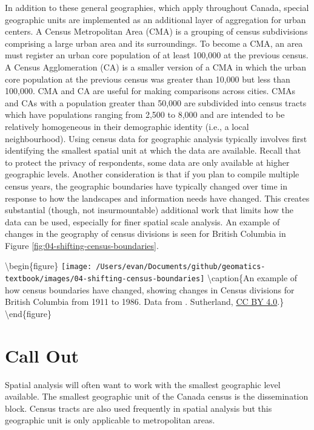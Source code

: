 \documentclass[
]{book}
\begin{document}
In addition to these general geographies, which apply throughout Canada, special geographic units are implemented as an additional layer of aggregation for urban centers. A Census Metropolitan Area (CMA) is a grouping of census subdivisions comprising a large urban area and its surroundings. To become a CMA, an area must register an urban core population of at least 100,000 at the previous census. A Census Agglomeration (CA) is a smaller version of a CMA in which the urban core population at the previous census was greater than 10,000 but less than 100,000. CMA and CA are useful for making comparisons across cities. CMAs and CAs with a population greater than 50,000 are subdivided into census tracts which have populations ranging from 2,500 to 8,000 and are intended to be relatively homogeneous in their demographic identity (i.e., a local neighbourhood).
Using census data for geographic analysis typically involves first identifying the smallest spatial unit at which the data are available. Recall that to protect the privacy of respondents, some data are only available at higher geographic levels. Another consideration is that if you plan to compile multiple census years, the geographic boundaries have typically changed over time in response to how the landscapes and information needs have changed. This creates substantial (though, not insurmountable) additional work that limits how the data can be used, especially for finer spatial scale analysis. An example of changes in the geography of census divisions is seen for British Columbia in Figure \ref{fig:04-shifting-census-boundaries}.

\textbackslash begin\{figure\}
\texttt{[image: /Users/evan/Documents/github/geomatics-textbook/images/04-shifting-census-boundaries]} \textbackslash caption\{An example of how census boundaries have changed, showing changes in Census divisions for British Columbia from 1911 to 1986. Data from \citet{clark_historical_2016}. Sutherland, \href{https://creativecommons.org/licenses/by/4.0/}{CC BY 4.0}.\}\label{fig:04-shifting-census-boundaries}
\textbackslash end\{figure\}

\hypertarget{call-out-1}{%
\section*{Call Out}\label{call-out-1}}

Spatial analysis will often want to work with the smallest geographic level available. The smallest geographic unit of the Canada census is the dissemination block. Census tracts are also used frequently in spatial analysis but this geographic unit is only applicable to metropolitan areas.
\end{document}
